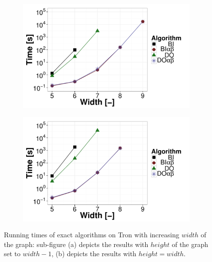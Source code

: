 \begin{figure}
\centering
	\begin{subfigure}{0.49\textwidth}
		\includegraphics[width=1\textwidth]{figures/Tron-1.pdf}\caption{}\label{fig:off:res:tron1}
	\end{subfigure}
	\begin{subfigure}{0.49\textwidth}
		\includegraphics[width=1\textwidth]{figures/Tron-2.pdf}\caption{}\label{fig:off:res:tron2}
	\end{subfigure}
\caption{Running times of exact algorithms on Tron with increasing $width$ of the graph: sub-figure (a) depicts the results with $height$ of the graph set to $width - 1$, (b) depicts the results with $height = width$.} \label{fig:off:res:tron}
\end{figure}

